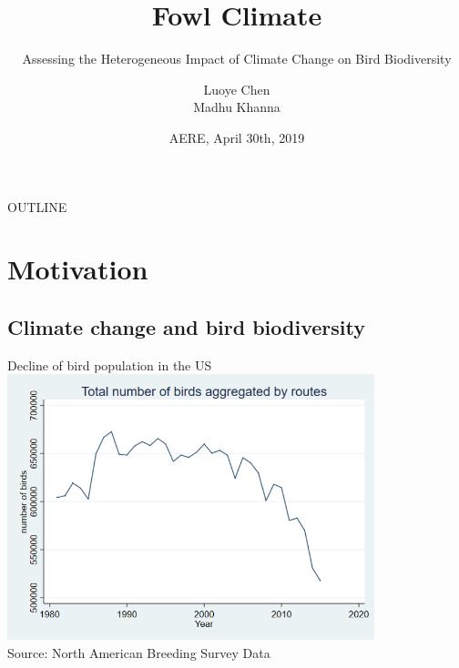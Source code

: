 \documentclass[handout]{beamer}
\title[Sauce for the Goose is not Sauce for the Gander] %
{Fowl Climate}
\subtitle
{Assessing the Heterogeneous Impact of Climate Change on Bird Biodiversity}
\author[Luoye Chen] %
{Luoye Chen\\ Madhu Khanna\inst{1}}
\institute[UIUC-ACE] %
{
  \inst{1}%
  Department of Agricultural and Consumer Economics\\
  University of Illinois at Urbana-Champaign
}
\date[pERE 2018] %
{AERE, April 30th, 2019}
\begin{document}
\begin{frame}
  \titlepage
\end{frame}

\begin{frame}{OUTLINE}
  \tableofcontents
\end{frame}





\section{Motivation}

\subsection{Climate change and bird biodiversity}

\begin{frame}{Decline of bird population in the US}
  \includegraphics[width=0.8\textwidth]{bird-1.png}\\
  {\footnotesize  Source: North American Breeding Survey Data}
\end{frame}
\end{document}
